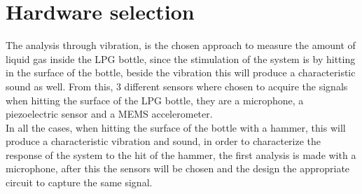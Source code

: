 \section{Hardware selection}%
The analysis through vibration, is the chosen approach to measure the amount of liquid gas inside the LPG bottle, since the stimulation of the system is by hitting in the surface of the bottle, beside the vibration this will produce a characteristic sound as well. From this, 3 different sensors where chosen to acquire the signals when hitting the surface of the LPG bottle, they are a microphone, a piezoelectric sensor and a MEMS accelerometer.\\
In all the cases, when hitting the surface of the bottle with a hammer, this will produce a characteristic vibration and sound, in order to characterize the response of the system to the hit of the hammer, the first analysis is made with a microphone, after this the sensors will be chosen and the design the appropriate circuit to capture the same signal.

